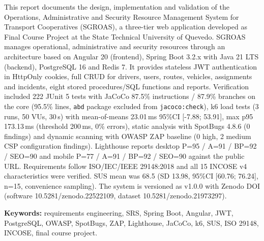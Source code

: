 This report documents the design, implementation and validation of the Operations, Administrative and Security Resource Management System for Transport Cooperatives (SGROAS), a three-tier web application developed as Final Course Project at the State Technical University of Quevedo. SGROAS manages operational, administrative and security resources through an architecture based on Angular 20 (frontend), Spring Boot 3.2.x with Java 21 LTS (backend), PostgreSQL 16 and Redis 7. It provides stateless JWT authentication in HttpOnly cookies, full CRUD for drivers, users, routes, vehicles, assignments and incidents, eight stored procedures/SQL functions and reports. Verification included 222 JUnit 5 tests with JaCoCo 87.5\% instructions / 87.9\% branches on the core (95.5\% lines, \texttt{abd} package excluded from \texttt{jacoco:check}), k6 load tests (3 runs, 50 VUs, 30\,s) with mean-of-means 23.01\,ms 95\%CI [-7.88; 53.91], max p95 173.13\,ms (threshold 200\,ms, 0\% errors), static analysis with SpotBugs 4.8.6 (0 findings) and dynamic scanning with OWASP ZAP baseline (0 high, 2 medium CSP configuration findings). Lighthouse reports desktop P=95 / A=91 / BP=92 / SEO=90 and mobile P=77 / A=91 / BP=92 / SEO=90 against the public URL. Requirements follow ISO/IEC/IEEE 29148:2018 and all 15 INCOSE v4 characteristics were verified. SUS mean was 68.5 (SD 13.98, 95\%CI [60.76; 76.24], n=15, convenience sampling). The system is versioned as v1.0.0 with Zenodo DOI (software 10.5281/zenodo.22522109, dataset 10.5281/zenodo.21973297).

\textbf{Keywords:} requirements engineering, SRS, Spring Boot, Angular, JWT, PostgreSQL, OWASP, SpotBugs, ZAP, Lighthouse, JaCoCo, k6, SUS, ISO 29148, INCOSE, final course project.
